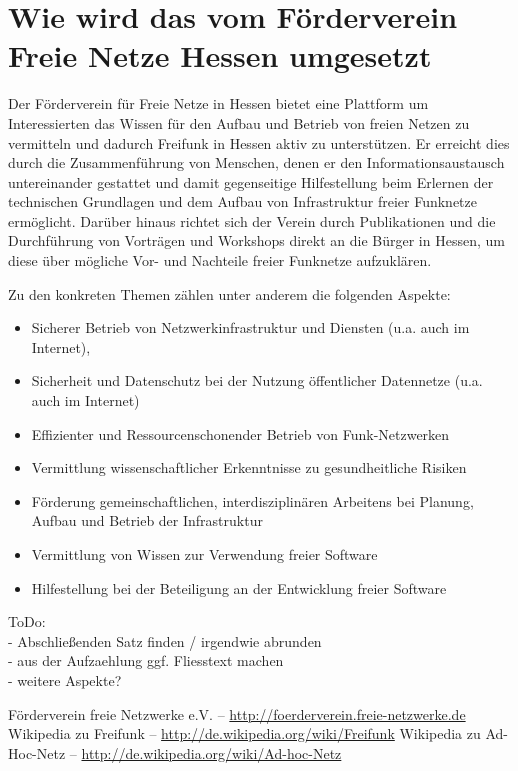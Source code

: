 \documentclass[ngerman]{article}
\begin{document}
\section*{Wie wird das vom Förderverein Freie Netze Hessen umgesetzt}

Der Förderverein für Freie Netze in Hessen bietet eine Plattform um Interessierten das Wissen für den Aufbau und Betrieb von freien Netzen zu vermitteln und dadurch Freifunk in Hessen aktiv zu unterstützen.
Er erreicht dies durch die Zusammenführung von Menschen, denen er den Informationsaustausch untereinander gestattet und damit gegenseitige Hilfestellung beim Erlernen der technischen Grundlagen und dem Aufbau von Infrastruktur freier Funknetze ermöglicht. 
Darüber hinaus richtet sich der Verein durch Publikationen und die Durchführung von Vorträgen und Workshops direkt an die Bürger in Hessen, um diese über mögliche Vor- und Nachteile freier Funknetze aufzuklären.

Zu den konkreten Themen zählen unter anderem die folgenden Aspekte:
\begin{itemize}
	\item Sicherer Betrieb von Netzwerkinfrastruktur und Diensten (u.a. auch im Internet),
	\item Sicherheit und Datenschutz bei der Nutzung öffentlicher Datennetze (u.a. auch im Internet)
	\item Effizienter und Ressourcenschonender Betrieb von Funk-Netzwerken
	\item Vermittlung wissenschaftlicher Erkenntnisse zu gesundheitliche Risiken
	\item Förderung gemeinschaftlichen, interdisziplinären Arbeitens bei Planung, Aufbau und Betrieb der Infrastruktur
	\item Vermittlung von Wissen zur Verwendung freier Software
	\item Hilfestellung bei der Beteiligung an der Entwicklung freier Software
\end{itemize}

\color{red}
ToDo:\\
- Abschließenden Satz finden / irgendwie abrunden\\
- aus der Aufzaehlung ggf. Fliesstext machen\\
- weitere Aspekte?

\color{black}
\begin{thebibliography}{1}
	 Förderverein freie Netzwerke e.V. -- \url{http://foerderverein.freie-netzwerke.de}
	 Wikipedia zu Freifunk -- \url{http://de.wikipedia.org/wiki/Freifunk}
	 Wikipedia zu Ad-Hoc-Netz -- \url{http://de.wikipedia.org/wiki/Ad-hoc-Netz}
\end{thebibliography}
\end{document}
